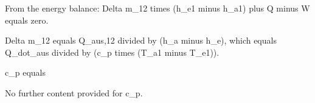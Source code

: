 From the energy balance:
Delta m_12 times (h_e1 minus h_a1) plus Q minus W equals zero.

Delta m_12 equals Q_aus,12 divided by (h_a minus h_e),
which equals Q_dot_aus divided by (c_p times (T_a1 minus T_e1)).

c_p equals

No further content provided for c_p.